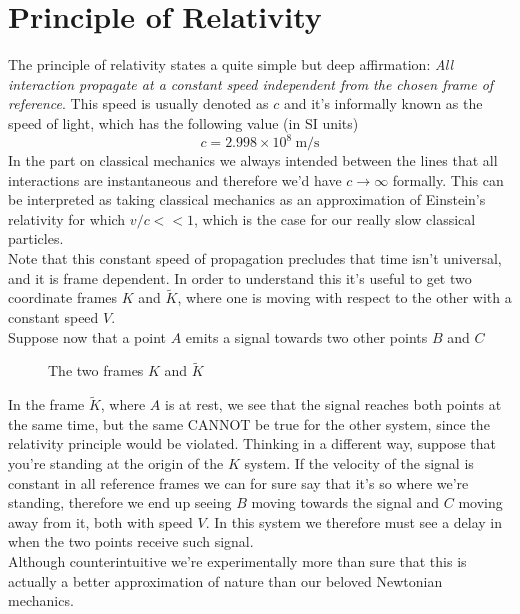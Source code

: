 \documentclass[../admech.tex]{subfiles}
\begin{document}
\section{Principle of Relativity}
The principle of relativity states a quite simple but deep affirmation: \emph{All interaction propagate at a constant speed independent from the chosen frame of reference}. This speed is usually denoted as $c$ and it's informally known as the speed of light, which has the following value (in SI units)
\begin{equation}
	c=2.998\times10^8\ \mathrm{m/s}
	\label{eq:clight}
\end{equation}
In the part on classical mechanics we always intended between the lines that all interactions are instantaneous and therefore we'd have $c\to\infty$ formally. This can be interpreted as taking classical mechanics as an approximation of Einstein's relativity for which $v/c<<1$, which is the case for our really slow classical particles.\\
Note that this constant speed of propagation precludes that time isn't universal, and it is frame dependent. In order to understand this it's useful to get two coordinate frames $K$ and $\tilde{K}$, where one is moving with respect to the other with a constant speed $V$.\\
Suppose now that a point $A$ emits a signal towards two other points $B$ and $C$ %
%
\begin{figure}[H]
	\centering
	\label{fig:srframestime}
	\caption{The two frames $K$ and $\tilde{K}$}
\end{figure}
In the frame $\tilde{K}$, where $A$ is at rest, we see that the signal reaches both points at the same time, but the same CANNOT be true for the other system, since the relativity principle would be violated. Thinking in a different way, suppose that you're standing at the origin of the $K$ system. If the velocity of the signal is constant in all reference frames we can for sure say that it's so where we're standing, therefore we end up seeing $B$ moving towards the signal and $C$ moving away from it, both with speed $V$. In this system we therefore must see a delay in when the two points receive such signal.\\
Although counterintuitive we're experimentally more than sure that this is actually a better approximation of nature than our beloved Newtonian mechanics.
\end{document}
